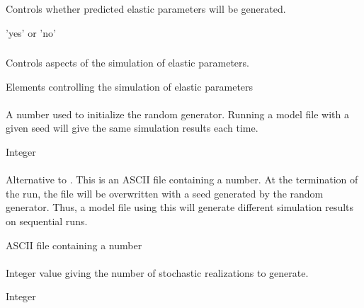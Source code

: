 \subsubsection{}  
 \slist
   \item \Description Controls whether predicted elastic parameters will be generated.
   \item \Argument 'yes' or 'no'
   \item \Default
 \elist

\subsubsection{}  
 \slist
   \item \Description Controls aspects of the simulation of elastic parameters.
   \item \Argument Elements controlling the simulation of elastic parameters
   \item \Default
 \elist



\paragraph{}  
 \slist
   \item \Description A number used to initialize the random generator. Running a model file with a given seed will give the same simulation results each time.
   \item \Argument Integer
   \item {}
 \elist

\paragraph{}  
 \slist
   \item \Description Alternative to . This is an ASCII file containing a number. At the termination of the run, the file will be overwritten with a seed generated by the random generator. Thus, a model file using this will generate different simulation results on sequential runs.
   \item \Argument ASCII file containing a number
   \item \Default
 \elist

\paragraph{}  
 \slist
   \item \Description Integer value giving the number of stochastic realizations to generate.
   \item \Argument Integer
   \item {}
 \elist

